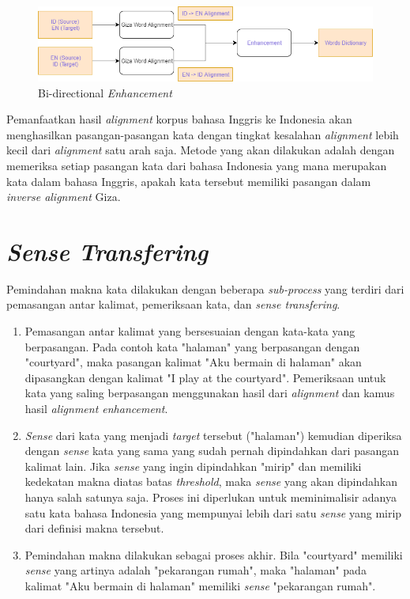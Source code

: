 \begin{figure}
	\centering
	\includegraphics[width=1\linewidth]{adit_pics/bidirectional-enhancement}
	\caption{Bi-directional \textit{Enhancement}}
	\label{fig:Bidirectional-Enhancement}
\end{figure}


Pemanfaatkan hasil \textit{alignment} korpus bahasa Inggris ke Indonesia akan menghasilkan pasangan-pasangan kata dengan tingkat kesalahan \textit{alignment} lebih kecil dari \textit{alignment} satu arah saja. Metode yang akan dilakukan adalah dengan memeriksa setiap pasangan kata dari bahasa Indonesia yang mana merupakan kata dalam bahasa Inggris, apakah kata tersebut memiliki pasangan dalam \textit{inverse alignment} Giza.




\section{\textit{Sense Transfering}} \label{sec:Sense Transfering}
Pemindahan makna kata dilakukan dengan beberapa \textit{sub-process} yang terdiri dari pemasangan antar kalimat, pemeriksaan kata, dan \textit{sense transfering}.
\begin{enumerate}
	\item Pemasangan antar kalimat yang bersesuaian dengan kata-kata yang berpasangan. Pada contoh kata "halaman" yang berpasangan dengan "courtyard", maka pasangan kalimat "Aku bermain di halaman" akan dipasangkan dengan kalimat "I play at the courtyard". Pemeriksaan untuk kata yang saling berpasangan menggunakan hasil dari \textit{alignment} dan kamus hasil \textit{alignment enhancement}.
	\item \textit{Sense} dari kata yang menjadi \textit{target} tersebut ("halaman") kemudian diperiksa dengan \textit{sense} kata yang sama yang sudah pernah dipindahkan dari pasangan kalimat lain. Jika \textit{sense} yang ingin dipindahkan "mirip" dan memiliki kedekatan makna diatas batas \textit{threshold}, maka \textit{sense} yang akan dipindahkan hanya salah satunya saja. Proses ini diperlukan untuk meminimalisir adanya satu kata bahasa Indonesia yang mempunyai lebih dari satu \textit{sense} yang mirip dari definisi makna tersebut.
	\item Pemindahan makna dilakukan sebagai proses akhir. Bila "courtyard" memiliki \textit{sense} yang artinya adalah "pekarangan rumah", maka "halaman" pada kalimat "Aku bermain di halaman" memiliki \textit{sense} "pekarangan rumah".
\end{enumerate}

